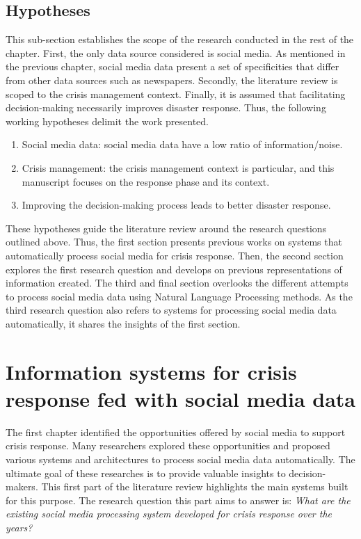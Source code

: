 \subsection*{Hypotheses}
This sub-section establishes the scope of the research conducted in the rest of the chapter.
First, the only data source considered is social media.
As mentioned in the previous chapter, social media data present a set of specificities that differ from other data sources such as newspapers.
Secondly, the literature review is scoped to the crisis management context.
Finally, it is assumed that facilitating decision-making necessarily improves disaster response.
Thus, the following working hypotheses delimit the work presented.

\begin{enumerate}
    \item Social media data: social media data have a low ratio of information/noise.
    \item Crisis management: the crisis management context is particular, and this manuscript focuses on the response phase and its context.
    \item Improving the decision-making process leads to better disaster response.
\end{enumerate}

These hypotheses guide the literature review around the research questions outlined above.
Thus, the first section presents previous works on systems that automatically process social media for crisis response.
Then, the second section explores the first research question and develops on previous representations of information created.
The third and final section overlooks the different attempts to process social media data using Natural Language Processing methods.
As the third research question also refers to systems for processing social media data automatically, it shares the insights of the first section.

\section{Information systems for crisis response fed with social media data}
The first chapter identified the opportunities offered by social media to support crisis response.
Many researchers explored these opportunities and proposed various systems and architectures to process social media data automatically.
The ultimate goal of these researches is to provide valuable insights to decision-makers.
This first part of the literature review highlights the main systems built for this purpose.
The research question this part aims to answer is: \emph{What are the existing social media processing system developed for crisis response over the years?}

